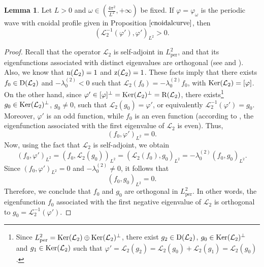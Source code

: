 \documentclass[10pt,reqno,a4paper]{amsart} %
\theoremstyle{definition} %
\numberwithin{equation}{section}
\numberwithin{figure}{section}
\newtheorem{lemma}[theorem]{Lemma}
\begin{document}
\begin{lemma}\label{L2-cnoidal}
Let $L>0$ and $\omega \in \left( \frac{4\pi^2}{L^2},+\infty\right)$ be fixed. If $\varphi=\varphi_\omega$ is the periodic wave with cnoidal profile given in Proposition $\ref{cnoidalcurve}$, then
	\begin{equation}
		( \mathcal{L}_2^{-1} (\varphi'),\varphi' )_{L^2} > 0.
	\end{equation}
\end{lemma}
\begin{proof}
Recall that the operator $\mathcal{L}_2$ is self-adjoint in $L^2_{\text{per}}$, and that its eigenfunctions associated with distinct eigenvalues are orthogonal (see \cite[Theorem 11.21]{AnguloBook} and \cite[Lemma 3.4]{Schmudgen}). Also, we know that ${\rm n}(\mathcal{L}_2)=1$ and ${\rm z}(\mathcal{L}_2)=1$. These facts imply that there exists $f_0 \in {\rm D}(\mathcal{L}_2)$ and $-\lambda_0^{(2)} < 0$ such that $\mathcal{L}_2(f_0) = -\lambda_0^{(2)} f_0$, with ${\rm Ker}(\mathcal{L}_2) = [\varphi]$. On the other hand, since $\varphi' \in [\varphi]^{\perp} = {\rm Ker}(\mathcal{L}_2)^{\perp} = {\rm R}(\mathcal{L}_2)$, there exists\footnote{Since $L^2_{\text{per}} = {\rm Ker}(\mathcal{L}_2) \oplus {\rm Ker}(\mathcal{L}_2)^{\perp}$, there exist $g_2 \in {\rm D}(\mathcal{L}_2)$, $g_0 \in {\rm Ker}(\mathcal{L}_2)^\perp$ and $g_1 \in {\rm Ker}(\mathcal{L}_2)$ such that $\varphi' = \mathcal{L}_2(g_2) = \mathcal{L}_2(g_0) + \mathcal{L}_2(g_1) = \mathcal{L}_2(g_0)$.} $g_0 \in {\rm Ker}(\mathcal{L}_2)^{\perp}$, $g_0 \neq 0$, such that $\mathcal{L}_2(g_0) = \varphi'$, or equivalently $\mathcal{L}_2^{-1}(\varphi') = g_0$. Moreover, $\varphi'$ is an odd function, while $f_0$ is an even function (according to \cite[Theorem 1.1]{MagnusWinkler}, the eigenfunction associated with the first eigenvalue of $\mathcal{L}_2$ is even). Thus,
\[
(f_0, \varphi')_{L^2} = 0.
\]
Now, using the fact that $\mathcal{L}_2$ is self-adjoint, we obtain
\[
(f_0, \varphi')_{L^2} = (f_0, \mathcal{L}_2(g_0))_{L^2} = (\mathcal{L}_2(f_0), g_0)_{L^2}=-\lambda_0^{(2)}(f_0, g_0)_{L^2}.
\]
Since $(f_0, \varphi')_{L^2} = 0$ and $-\lambda_0^{(2)} \neq 0$, it follows that
\[
(f_0, g_0)_{L^2} = 0.
\]
Therefore, we conclude that $f_0$ and $g_0$ are orthogonal in $L^2_{\text{per}}$. In other words, the eigenfunction $f_0$ associated with the first negative eigenvalue of $\mathcal{L}_2$ is orthogonal to $g_0 = \mathcal{L}_2^{-1}(\varphi')$.


\end{proof}
\end{document}
